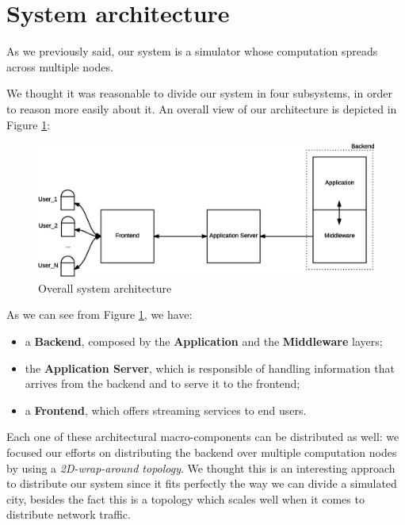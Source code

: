\section{System architecture}
As we previously said, our system is a simulator whose computation spreads
across multiple nodes.

We thought it was reasonable to divide our system in four subsystems, in order
to reason more easily about it. An overall view of our architecture is depicted
in Figure \ref{fig:sd-sys-arch-overall}:

\begin{figure}[H]
  \centering
  \includegraphics[scale=0.5,keepaspectratio]
    {images/solution/overall-arch.eps}
  \caption{Overall system architecture}
  \label{fig:sd-sys-arch-overall}
\end{figure}

As we can see from Figure \ref{fig:sd-sys-arch-overall}, we have:

\begin{itemize}
  \item a \textbf{Backend}, composed by the \textbf{Application} and the
    \textbf{Middleware} layers;
  \item the \textbf{Application Server}, which is responsible of handling
    information that arrives from the backend and to serve it to the frontend;
  \item a \textbf{Frontend}, which offers streaming services to end users.
\end{itemize}

Each one of these architectural macro-components can be distributed as well: we
focused our efforts on distributing the backend over multiple computation nodes
by using a \textit{2D-wrap-around topology}.
We thought this is an interesting approach to distribute our system since it
fits perfectly the way we can divide a simulated city, besides the fact this is
a topology which scales well when it comes to distribute network traffic.

